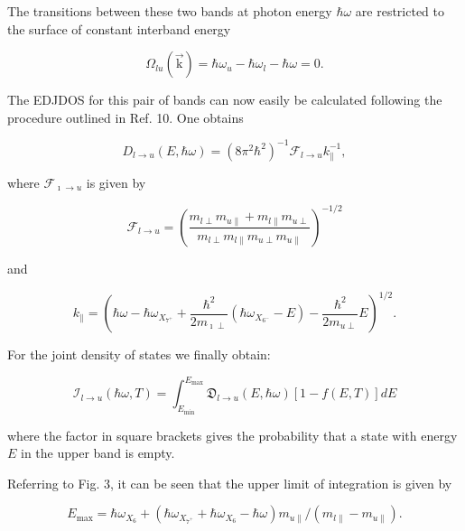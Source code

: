 \documentclass[10pt]{article}
\begin{document}
The transitions between these two bands at photon energy $\hbar \omega$ are restricted to the surface of constant interband energy


\begin{equation*}
\Omega_{l u}(\overrightarrow{\mathrm{k}})=\hbar \omega_{u}-\hbar \omega_{l}-\hbar \omega=0 . \tag{3}
\end{equation*}


The EDJDOS for this pair of bands can now easily be calculated following the procedure outlined in Ref. 10. One obtains


\begin{equation*}
D_{l \rightarrow u}(E, \hbar \omega)=\left(8 \pi^{2} \hbar^{2}\right)^{-1} \mathcal{F}_{l \rightarrow u} k_{\|}^{-1}, \tag{4}
\end{equation*}


where $\mathcal{F}_{\imath \rightarrow u}$ is given by


\begin{equation*}
\mathcal{F}_{l \rightarrow u}=\left(\frac{m_{l \perp} m_{u \|}+m_{l \|} m_{u \perp}}{m_{l \perp} m_{l \|} m_{u \perp} m_{u \|}}\right)^{-1 / 2} \tag{5}
\end{equation*}


and


\begin{equation*}
k_{\|}=\left(\hbar \omega-\hbar \omega_{X_{7^{+}}}+\frac{\hbar^{2}}{2 m_{\imath \perp}}\left(\hbar \omega_{X_{6^{-}}}-E\right)-\frac{\hbar^{2}}{2 m_{u \perp}} E\right)^{1 / 2} . \tag{6}
\end{equation*}


For the joint density of states we finally obtain:


\begin{equation*}
\mathcal{I}_{l \rightarrow u}(\hbar \omega, T)=\int_{E_{\min }}^{E_{\max }} \mathfrak{D}_{l \rightarrow u}(E, \hbar \omega)[1-f(E, T)] d E \tag{7}
\end{equation*}


where the factor in square brackets gives the probability that a state with energy $E$ in the upper band is empty.

Referring to Fig. 3, it can be seen that the upper limit of integration is given by


\begin{equation*}
E_{\max }=\hbar \omega_{X_{6}}+\left(\hbar \omega_{X_{7^{+}}}+\hbar \omega_{X_{6}}-\hbar \omega\right) m_{u \|} /\left(m_{l \|}-m_{u \|}\right) . \tag{8}
\end{equation*}
\end{document}

